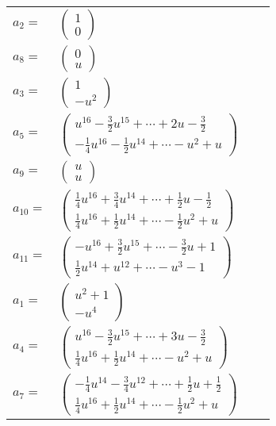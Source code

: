 \documentclass[1p]{elsarticle_modified}
\theoremstyle{definition}
\begin{document}
\begin{tabular}{m{7pt} m{180pt} m{7pt} m{180pt} }
\flushright $a_{2}=$&$\begin{pmatrix}1\\0\end{pmatrix}$ \\
\flushright $a_{8}=$&$\begin{pmatrix}0\\u\end{pmatrix}$ \\
\flushright $a_{3}=$&$\begin{pmatrix}1\\- u^2\end{pmatrix}$ \\
\flushright $a_{5}=$&$\begin{pmatrix}u^{16}-\frac{3}{2} u^{15}+\cdots+2 u-\frac{3}{2}\\-\frac{1}{4} u^{16}-\frac{1}{2} u^{14}+\cdots- u^2+u\end{pmatrix}$ \\
\flushright $a_{9}=$&$\begin{pmatrix}u\\u\end{pmatrix}$ \\
\flushright $a_{10}=$&$\begin{pmatrix}\frac{1}{4} u^{16}+\frac{3}{4} u^{14}+\cdots+\frac{1}{2} u-\frac{1}{2}\\\frac{1}{4} u^{16}+\frac{1}{2} u^{14}+\cdots-\frac{1}{2} u^2+u\end{pmatrix}$ \\
\flushright $a_{11}=$&$\begin{pmatrix}- u^{16}+\frac{3}{2} u^{15}+\cdots-\frac{3}{2} u+1\\\frac{1}{2} u^{14}+u^{12}+\cdots- u^3-1\end{pmatrix}$ \\
\flushright $a_{1}=$&$\begin{pmatrix}u^2+1\\- u^4\end{pmatrix}$ \\
\flushright $a_{4}=$&$\begin{pmatrix}u^{16}-\frac{3}{2} u^{15}+\cdots+3 u-\frac{3}{2}\\\frac{1}{4} u^{16}+\frac{1}{2} u^{14}+\cdots- u^2+u\end{pmatrix}$ \\
\flushright $a_{7}=$&$\begin{pmatrix}-\frac{1}{4} u^{14}-\frac{3}{4} u^{12}+\cdots+\frac{1}{2} u+\frac{1}{2}\\\frac{1}{4} u^{16}+\frac{1}{2} u^{14}+\cdots-\frac{1}{2} u^2+u\end{pmatrix}$ \\

\end{tabular}
\end{document}
